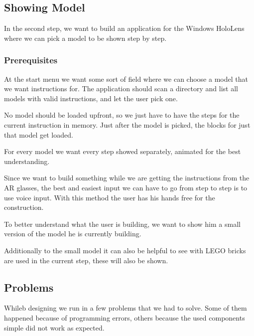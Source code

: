 \documentclass[11pt,a4paper]{article}
\begin{document}
	
	\subsection{Showing Model}
	
	In the second step, we want to build an application for the Windows HoloLens where we can pick a model to be shown step by step.
		
		\subsubsection{Prerequisites}
		\begin{description}[align=left]
			\item [Model picker] 
			At the start menu we want some sort of field where we can choose a model that we want instructions for. The application should scan a directory and list all models with valid instructions, and let the user pick one.
			
			\item [Dynamically Loading] 
			No model should be loaded upfront, so we just have to have the steps for the current instruction in memory. Just after the model is picked, the blocks for just that model get loaded.
			
			\item [Step by Step Instruction]
			For every model we want every step showed separately, animated for the best understanding.  
			
			\item [Voice Input]
			Since we want to build something while we are getting the instructions from the AR glasses, the best and easiest input we can have to go from step to step is to use voice input. With this method the user has his hands free for the construction. 
			
			\item [Small model]
			To better understand what the user is building, we want to show him a small version of the model he is currently building.
			
			\item [Bricks per Step]
			Additionally to the small model it can also be helpful to see with LEGO bricks are used in the current step, these will also be shown.
			
		\end{description}
	
	 
	
	\subsection{Problems}
	Whileb designing we run in a few problems that we had to solve. Some of them happened because of programming errors, others because the used components simple did not work as expected.
	
\end{document}
